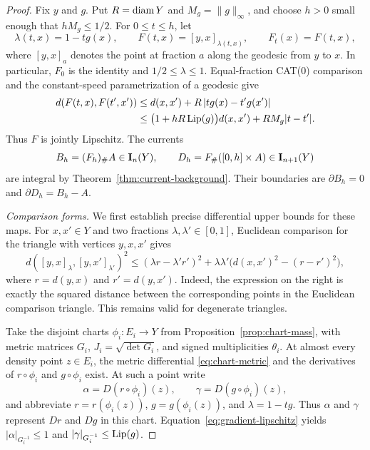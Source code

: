 \begin{proof}
Fix $y$ and $g$.  Put $R=\operatorname{diam} Y$ and $M_g=\|g\|_\infty$, and choose
$h>0$ small enough that $hM_g\leq 1/2$.  For $0\leq t\leq h$, let
\[
 \lambda(t,x)=1-tg(x),\qquad
 F(t,x)=[y,x]_{\lambda(t,x)},\qquad F_t(x)=F(t,x),
\]
where $[y,x]_a$ denotes the point at fraction $a$ along the geodesic
from $y$ to $x$.  In particular, $F_0$ is the identity and
$1/2\leq\lambda\leq1$.  Equal-fraction CAT(0) comparison and the
constant-speed parametrization of a geodesic give
\begin{align*}
 d(F(t,x),F(t',x'))
 &\leq d(x,x')+R\,|tg(x)-t'g(x')|\\
 &\leq \bigl(1+hR\operatorname{Lip}(g)\bigr)d(x,x')
       +RM_g|t-t'|.
\end{align*}
Thus $F$ is jointly Lipschitz.  The currents
\[
 B_h=(F_h)_\#A\in\mathbf I_n(Y),\qquad
 D_h=F_\#([0,h]\times A)\in\mathbf I_{n+1}(Y)
\]
are integral by Theorem~\ref{thm:current-background}.  Their boundaries
are $\partial B_h=0$ and $\partial D_h=B_h-A$.

\emph{Comparison forms.}
We first establish precise differential upper bounds for these maps.
For $x,x'\in Y$ and two fractions $\lambda,\lambda'\in[0,1]$, Euclidean
comparison for the triangle with vertices $y,x,x'$ gives
\begin{equation}
 d([y,x]_\lambda,[y,x']_{\lambda'})^2
 \leq (\lambda r-\lambda'r')^2
       +\lambda\lambda'\bigl(d(x,x')^2-(r-r')^2\bigr),
 \label{eq:radial-two-point}
\end{equation}
where $r=d(y,x)$ and $r'=d(y,x')$.  Indeed, the expression on the
right is exactly the squared distance between the corresponding
points in the Euclidean comparison triangle.  This remains valid for
degenerate triangles.

Take the disjoint charts $\phi_i:E_i\to Y$ from
Proposition~\ref{prop:chart-mass}, with metric matrices $G_i$,
$J_i=\sqrt{\det G_i}$, and signed multiplicities $\theta_i$.
At almost every density point $z\in E_i$, the metric differential
\eqref{eq:chart-metric} and the derivatives of $r\circ\phi_i$ and
$g\circ\phi_i$ exist.  At such a point write
\[
 \alpha=D(r\circ\phi_i)(z),\qquad
 \gamma=D(g\circ\phi_i)(z),
\]
and abbreviate $r=r(\phi_i(z))$, $g=g(\phi_i(z))$, and
$\lambda=1-tg$.  Thus $\alpha$ and $\gamma$ represent $Dr$ and $Dg$
in this chart.  Equation~\eqref{eq:gradient-lipschitz} yields
$|\alpha|_{G_i^{-1}}\leq1$ and
$|\gamma|_{G_i^{-1}}\leq\operatorname{Lip}(g)$.


\end{proof}
